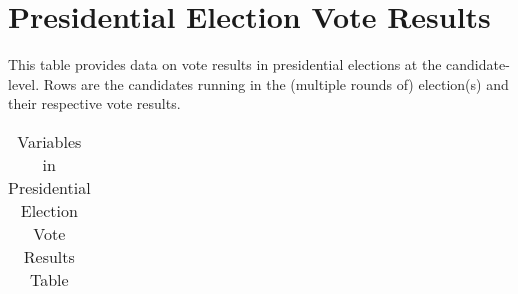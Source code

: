 \section{Presidential Election Vote Results}\label{sec_presidential_election_vote_results}
This table provides data on vote results in presidential elections at the candidate-level. 
Rows are the candidates running in the (multiple rounds of) election(s) and their respective vote results.


\begin{center}
\begin{longtable}{L{4cm} L{6cm} L{3cm}}
\caption{Variables in Presidential Election Vote Results Table\label{tab_presidential_election_vote_results}}


\end{longtable}
\end{center}
